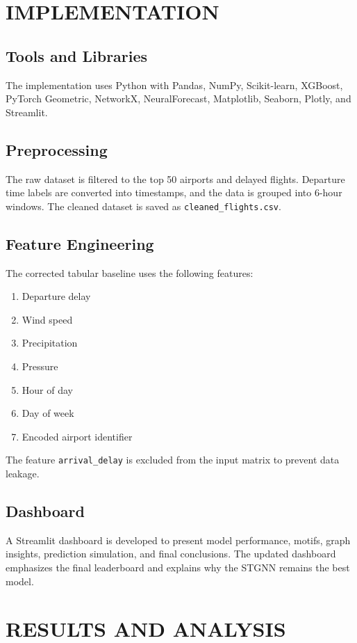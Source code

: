 \documentclass[12pt,a4paper]{report}
\begin{document}
\chapter{IMPLEMENTATION}
\noindent{\rule{\textwidth}{1.5pt}}

\section{Tools and Libraries}
The implementation uses Python with Pandas, NumPy, Scikit-learn, XGBoost, PyTorch Geometric, NetworkX, NeuralForecast, Matplotlib, Seaborn, Plotly, and Streamlit.

\section{Preprocessing}
The raw dataset is filtered to the top 50 airports and delayed flights. Departure time labels are converted into timestamps, and the data is grouped into 6-hour windows. The cleaned dataset is saved as \texttt{cleaned\_flights.csv}.

\section{Feature Engineering}
The corrected tabular baseline uses the following features:
\begin{enumerate}
	\item Departure delay
	\item Wind speed
	\item Precipitation
	\item Pressure
	\item Hour of day
	\item Day of week
	\item Encoded airport identifier
\end{enumerate}
The feature \texttt{arrival\_delay} is excluded from the input matrix to prevent data leakage.

\section{Dashboard}
A Streamlit dashboard is developed to present model performance, motifs, graph insights, prediction simulation, and final conclusions. The updated dashboard emphasizes the final leaderboard and explains why the STGNN remains the best model.

\chapter{RESULTS AND ANALYSIS}
\noindent{\rule{\textwidth}{1.5pt}}
\end{document}
